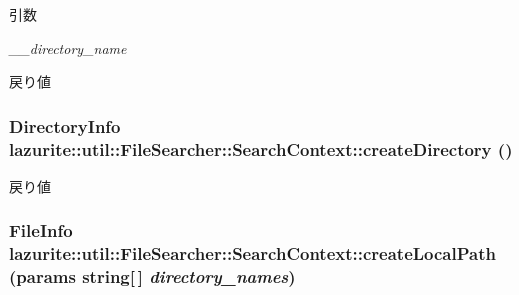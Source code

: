 \begin{DoxyParams}{引数}
\item[{\em \_\-\_\-directory\_\-name}]\end{DoxyParams}
\begin{DoxyReturn}{戻り値}

\end{DoxyReturn}
\hypertarget{classlazurite_1_1util_1_1_file_searcher_1_1_search_context_aefc87e869317b4b994e18d1ba75c9839}{
\subsubsection[{createDirectory}]{\setlength{\rightskip}{0pt plus 5cm}DirectoryInfo lazurite::util::FileSearcher::SearchContext::createDirectory ()}}
\label{classlazurite_1_1util_1_1_file_searcher_1_1_search_context_aefc87e869317b4b994e18d1ba75c9839}
\begin{DoxyReturn}{戻り値}

\end{DoxyReturn}
\hypertarget{classlazurite_1_1util_1_1_file_searcher_1_1_search_context_ae7e7380a0004bb7e1d68b6b71531c64c}{
\subsubsection[{createLocalPath}]{\setlength{\rightskip}{0pt plus 5cm}FileInfo lazurite::util::FileSearcher::SearchContext::createLocalPath (params string\mbox{[}$\,$\mbox{]} {\em directory\_\-names})}}
\label{classlazurite_1_1util_1_1_file_searcher_1_1_search_context_ae7e7380a0004bb7e1d68b6b71531c64c}

